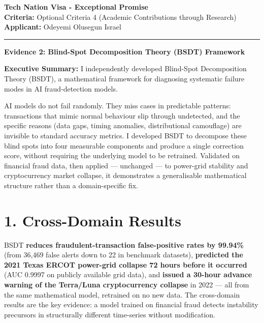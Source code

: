 \documentclass[11pt,a4paper]{article}
\begin{document}
\noindent\textbf{\Large Tech Nation Visa - Exceptional Promise}\\
\noindent\textbf{Criteria:} Optional Criteria 4 (Academic Contributions through Research)\\
\noindent\textbf{Applicant:} Odeyemi Olusegun Israel\\
\rule{\textwidth}{0.4pt}

\vspace{0.1cm}
\begin{center}
    \textbf{\large Evidence 2: Blind-Spot Decomposition Theory (BSDT) Framework}
\end{center}
\vspace{0.05cm}

\noindent\textbf{Executive Summary:} I independently developed Blind-Spot Decomposition Theory (BSDT), a mathematical framework for diagnosing systematic failure modes in AI fraud-detection models.

AI models do not fail randomly. They miss cases in predictable patterns: transactions that mimic normal behaviour slip through undetected, and the specific reasons (data gaps, timing anomalies, distributional camouflage) are invisible to standard accuracy metrics. I developed BSDT to decompose these blind spots into four measurable components and produce a single correction score, without requiring the underlying model to be retrained. Validated on financial fraud data, then applied --- unchanged --- to power-grid stability and cryptocurrency market collapse, it demonstrates a generalisable mathematical structure rather than a domain-specific fix.

\section*{1. Cross-Domain Results}
BSDT \textbf{reduces fraudulent-transaction false-positive rates by 99.94\%} (from 36,469 false alerts down to 22 in benchmark datasets), \textbf{predicted the 2021 Texas ERCOT power-grid collapse 72 hours before it occurred} (AUC 0.9997 on publicly available grid data), and \textbf{issued a 30-hour advance warning of the Terra/Luna cryptocurrency collapse} in 2022 --- all from the same mathematical model, retrained on no new data. The cross-domain results are the key evidence: a model trained on financial fraud detects instability precursors in structurally different time-series without modification.
\end{document}

